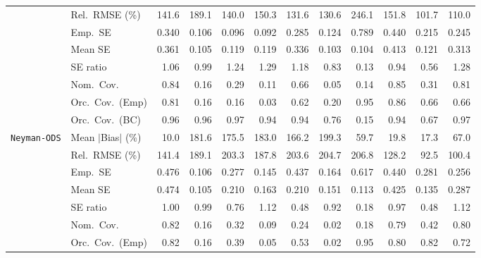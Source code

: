 \begin{landscape}
\begin{longtable}{llrrrrrrrrrr}
 & Rel.\ RMSE (\%) & 141.6 & 189.1 & 140.0 & 150.3 & 131.6 & \cellcolor{rankthree}130.6 & 246.1 & 151.8 & \cellcolor{rankone}101.7 & \cellcolor{ranktwo}110.0 \\
 & Emp.\ SE & 0.340 & 0.106 & 0.096 & 0.092 & 0.285 & 0.124 & 0.789 & 0.440 & 0.215 & 0.245 \\
 & Mean SE & 0.361 & 0.105 & 0.119 & 0.119 & 0.336 & 0.103 & 0.104 & 0.413 & 0.121 & 0.313 \\
 & SE ratio & \cellcolor{ranktwo}1.06 & \cellcolor{rankone}0.99 & 1.24 & 1.29 & 1.18 & \cellcolor{rankthree}0.83 & 0.13 & \cellcolor{ranktwo}0.94 & 0.56 & 1.28 \\
 & Nom.\ Cov. & \cellcolor{ranktwo}0.84 & 0.16 & 0.29 & 0.11 & 0.66 & 0.05 & 0.14 & \cellcolor{rankone}0.85 & 0.31 & \cellcolor{rankthree}0.81 \\
 & Orc.\ Cov.\ (Emp) & \cellcolor{rankthree}0.81 & 0.16 & 0.16 & 0.03 & 0.62 & 0.20 & \cellcolor{rankone}0.95 & \cellcolor{ranktwo}0.86 & 0.66 & 0.66 \\
 & Orc.\ Cov.\ (BC) & \cellcolor{rankone}0.96 & \cellcolor{rankone}0.96 & \cellcolor{ranktwo}0.97 & \cellcolor{rankone}0.94 & \cellcolor{rankone}0.94 & \cellcolor{rankthree}0.76 & 0.15 & \cellcolor{rankone}0.94 & 0.67 & \cellcolor{ranktwo}0.97 \\
\addlinespace[2pt]
\quad \texttt{Neyman-ODS} & Mean $|$Bias$|$ (\%) & \cellcolor{rankone}10.0 & 181.6 & 175.5 & 183.0 & 166.2 & 199.3 & 59.7 & \cellcolor{rankthree}19.8 & \cellcolor{ranktwo}17.3 & 67.0 \\
 & Rel.\ RMSE (\%) & 141.4 & 189.1 & 203.3 & 187.8 & 203.6 & 204.7 & 206.8 & \cellcolor{rankthree}128.2 & \cellcolor{rankone}92.5 & \cellcolor{ranktwo}100.4 \\
 & Emp.\ SE & 0.476 & 0.106 & 0.277 & 0.145 & 0.437 & 0.164 & 0.617 & 0.440 & 0.281 & 0.256 \\
 & Mean SE & 0.474 & 0.105 & 0.210 & 0.163 & 0.210 & 0.151 & 0.113 & 0.425 & 0.135 & 0.287 \\
 & SE ratio & \cellcolor{rankone}1.00 & \cellcolor{ranktwo}0.99 & 0.76 & 1.12 & 0.48 & 0.92 & 0.18 & \cellcolor{rankthree}0.97 & 0.48 & 1.12 \\
 & Nom.\ Cov. & \cellcolor{rankone}0.82 & 0.16 & 0.32 & 0.09 & 0.24 & 0.02 & 0.18 & \cellcolor{rankthree}0.79 & 0.42 & \cellcolor{ranktwo}0.80 \\
 & Orc.\ Cov.\ (Emp) & \cellcolor{ranktwo}0.82 & 0.16 & 0.39 & 0.05 & 0.53 & 0.02 & \cellcolor{rankone}0.95 & \cellcolor{rankthree}0.80 & \cellcolor{ranktwo}0.82 & 0.72 \\

\end{longtable}
\end{landscape}
